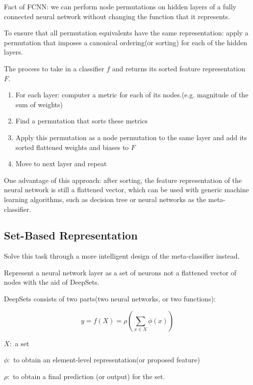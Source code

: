 \documentclass[11pt]{article}
\numberwithin{equation}{section}
\begin{document}
Fact of FCNN: we can perform node permutations on hidden layers of a fully connected neural network without changing the function that it represents.

To ensure that all permutation equivalents have the same representation: apply a permutation that imposes a canonical ordering(or sorting) for each of the hidden layers.

The process to take in a classifier $f$ and returns its sorted feature representation $F$.

\begin{enumerate}
    \item For each layer: computer a metric for each of its nodes.(e.g. magnitude of the sum of weights)
    \item Find a permutation that sorts these metrics
    \item Apply this permutation as a node permutation to the same layer and add its sorted flattened weights and biases to $F$
    \item Move to next layer and repeat
\end{enumerate}

One advantage of this approach: after sorting, the feature representation of the neural network is still a flattened vector, which can be used with generic machine learning algorithms, such as decision tree or neural networks as the meta-classifier.


\subsection{Set-Based Representation}

Solve this task through a more intelligent design of the meta-classifier instead. 

Represent a neural network layer as a set of neurons not a flattened vector of nodes with the aid of DeepSets.

DeepSets consists of two parts(two neural networks, or two functions):

\begin{equation*}
    y = f(X) = \rho\left(\sum_{x \in X}\phi(x)\right)
\end{equation*}

$X:$ a set

$\phi:$ to obtain an element-level representation(or proposed feature)

$\rho:$ to obtain a final prediction (or output) for the set.
\end{document}
